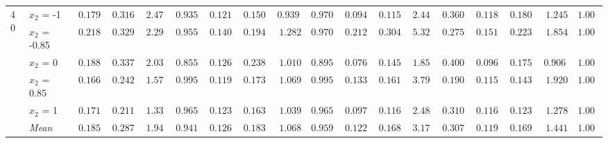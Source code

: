 \begin{table}[htbp]
\begin{tabular}{llrrrrrrrrrrrrrrrr}
\midrule
\multirow{6}{*}{40} & $x_2$ = -1 & $0.1797$ & $0.3163$ & $2.472$ & {\boldmath$0.9350$} & $0.1213$ & $0.1503$ & {\boldmath$0.9393$} & $0.9700$ & {\boldmath$0.0948$} & {\boldmath$0.1151$} & $2.447$ & $0.3600$ & $0.1187$ & $0.1803$ & $1.245$ & $1.000$ \\
 & $x_2$ = -0.85 & $0.2187$ & $0.3297$ & $2.297$ & {\boldmath$0.9550$} & {\boldmath$0.1404$} & {\boldmath$0.1948$} & {\boldmath$1.282$} & $0.9700$ & $0.2121$ & $0.3042$ & $5.321$ & $0.2750$ & $0.1516$ & $0.2230$ & $1.854$ & $1.000$ \\
 & $x_2$ = 0 & $0.1888$ & $0.3379$ & $2.033$ & $0.8550$ & $0.1261$ & $0.2380$ & $1.010$ & $0.8950$ & {\boldmath$0.0768$} & {\boldmath$0.1458$} & $1.851$ & $0.4000$ & $0.0960$ & $0.1751$ & {\boldmath$0.9064$} & {\boldmath$1.000$} \\
 & $x_2$ = 0.85 & $0.1662$ & $0.2421$ & $1.571$ & {\boldmath$0.9950$} & $0.1191$ & $0.1736$ & {\boldmath$1.069$} & $0.9950$ & $0.1337$ & $0.1614$ & $3.791$ & $0.1900$ & {\boldmath$0.1159$} & {\boldmath$0.1433$} & $1.920$ & $1.000$ \\
 & $x_2$ = 1 & $0.1719$ & $0.2113$ & $1.338$ & {\boldmath$0.9650$} & $0.1238$ & $0.1630$ & {\boldmath$1.039$} & $0.9650$ & {\boldmath$0.0972$} & {\boldmath$0.1160$} & $2.485$ & $0.3100$ & $0.1162$ & $0.1233$ & $1.278$ & $1.000$ \\
 & \textit{Mean} & $0.1851$ & $0.2875$ & $1.942$ & \colorbox{green!20}{\boldmath$0.9410$} & $0.1261$ & $0.1839$ & \colorbox{green!20}{\boldmath$1.068$} & $0.9590$ & $0.1229$ & \colorbox{green!20}{\boldmath$0.1685$} & $3.179$ & $0.3070$ & \colorbox{green!20}{\boldmath$0.1197$} & $0.1690$ & $1.441$ & $1.000$ \\
\bottomrule
\end{tabular}
\end{table}
